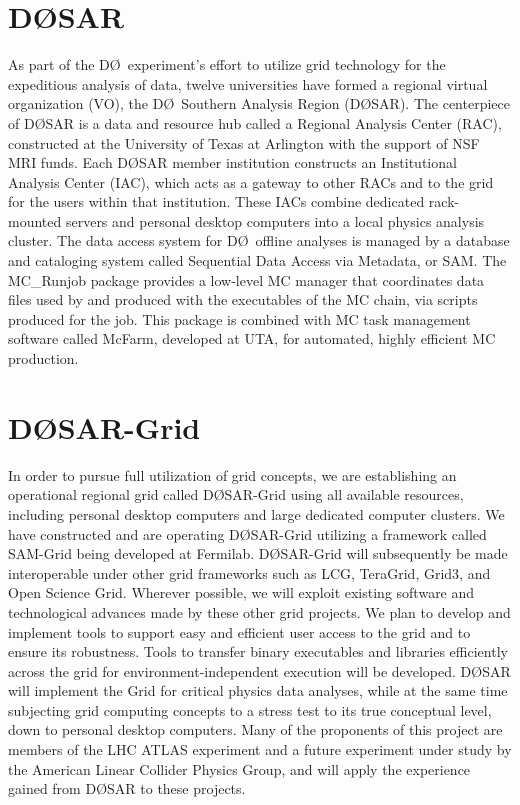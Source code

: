 \documentclass{revtex4}
\newcommand{\DO}{\mbox{D\O}}
\begin{document}
\section{\DO SAR}

As part of the \DO\ experiment's effort to utilize grid technology for the expeditious analysis of data, twelve universities have formed a regional virtual organization (VO), the \DO\ Southern Analysis Region (\DO SAR).\cite{d0sar}  The centerpiece of \DO SAR is a data and resource hub called a Regional Analysis Center (RAC),\cite{d0rac} constructed at the University of Texas at Arlington with the support of NSF MRI funds.  Each \DO SAR member institution constructs an Institutional Analysis Center (IAC), which acts as a gateway to other RACs and to the grid for the users within that institution.   These IACs combine dedicated rack-mounted servers and personal desktop computers into a local physics analysis cluster. The data access system for \DO\ offline analyses is managed by a database and cataloging system called Sequential Data Access via Metadata, or SAM.\cite{sam} The MC\_Runjob package\cite{mcrunjob} provides a low-level MC manager that coordinates data files used by and produced with the executables of the MC chain, via scripts produced for the job. This package is combined with MC task management software called McFarm\cite{mcfarm}, developed at UTA, for automated, highly efficient MC production.

\section{\DO SAR-Grid}

In order to pursue full utilization of grid concepts, we are establishing an operational regional grid called \DO SAR-Grid using all available resources, including personal desktop computers and large dedicated computer clusters. We have constructed and are operating \DO SAR-Grid utilizing a framework called SAM-Grid\cite{samgrid} being developed at Fermilab.  \DO SAR-Grid will subsequently be made interoperable under other grid frameworks such as LCG,\cite{lcg} TeraGrid,\cite{teragrid} Grid3,\cite{grid3} and Open Science Grid.\cite{osg}  Wherever possible, we will exploit existing software and technological advances made by these other grid projects. We plan to develop and implement tools to support easy and efficient user access to the grid and to ensure its robustness. Tools to transfer binary executables and libraries efficiently across the grid for environment-independent execution will be developed. \DO SAR will implement the Grid for critical physics data analyses, while at the same time subjecting grid computing concepts to a stress test to its true conceptual level, down to personal desktop computers. Many of the proponents of this project are members of the LHC ATLAS\cite{atlas} experiment and a future experiment under study by the American Linear Collider Physics Group,\cite{alcpg} and will apply the experience gained from \DO SAR to these projects.
\end{document}
